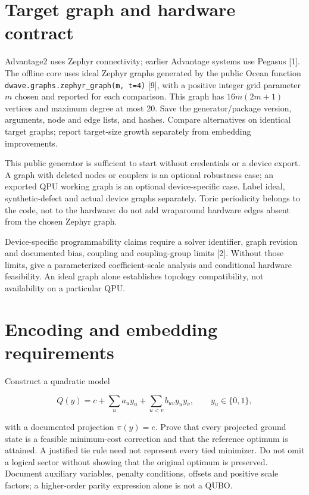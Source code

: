 \documentclass[11pt,letterpaper]{article}
\begin{document}
\section{Target graph and hardware contract}

Advantage2 uses Zephyr connectivity; earlier Advantage systems use Pegasus [1]. The offline core uses ideal Zephyr graphs generated by the public Ocean function \texttt{dwave.graphs.zephyr\_graph(m, t=4)} [9], with a positive integer grid parameter $m$ chosen and reported for each comparison. This graph has $16m(2m+1)$ vertices and maximum degree at most 20. Save the generator/package version, arguments, node and edge lists, and hashes. Compare alternatives on identical target graphs; report target-size growth separately from embedding improvements.\par

This public generator is sufficient to start without credentials or a device export. A graph with deleted nodes or couplers is an optional robustness case; an exported QPU working graph is an optional device-specific case. Label ideal, synthetic-defect and actual device graphs separately. Toric periodicity belongs to the code, not to the hardware: do not add wraparound hardware edges absent from the chosen Zephyr graph.\par

Device-specific programmability claims require a solver identifier, graph revision and documented bias, coupling and coupling-group limits [2]. Without those limits, give a parameterized coefficient-scale analysis and conditional hardware feasibility. An ideal graph alone establishes topology compatibility, not availability on a particular QPU.\par

\section{Encoding and embedding requirements}

Construct a quadratic model\par

\[Q(y)=c+\sum_u a_u y_u+\sum_{u<v}b_{uv}y_uy_v,\qquad y_u\in\{0,1\},\]

with a documented projection $\pi(y)=e$. Prove that every projected ground state is a feasible minimum-cost correction and that the reference optimum is attained. A justified tie rule need not represent every tied minimizer. Do not omit a logical sector without showing that the original optimum is preserved. Document auxiliary variables, penalty conditions, offsets and positive scale factors; a higher-order parity expression alone is not a QUBO.\par
\end{document}
